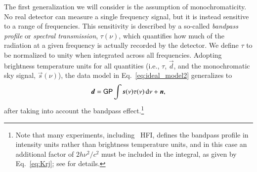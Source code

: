 \documentclass[twocolumn]{aa}
\renewcommand{\d}[0]{\vec{d}}
\newcommand{\n}[0]{\vec{n}}
\newcommand{\s}[0]{\vec{s}}
\renewcommand{\P}[0]{\tens{P}}
\renewcommand{\G}[0]{\tens{G}}
\begin{document}
The first generalization we will consider is the assumption of
monochromaticity. No real detector can measure a single frequency
signal, but it is instead sensitive to a range of frequencies. This
sensitivity is described by a so-called \emph{bandpass profile} or
\emph{spectral transmission}, $\tau(\nu)$, which quantifies how much
of the radiation at a given frequency is actually recorded by the
detector. We define $\tau$ to be normalized to unity when integrated across
all frequencies. Adopting brightness temperature units for all
quantities (i.e., $\tau$, $\d$, and the monochromatic sky signal,
$\s(\nu)$), the data model in Eq.~\eqref{eq:ideal_model2} generalizes to
\begin{equation}
  \d = \G \P\int \s(\nu)\tau(\nu)\,\mathrm d\nu + \n,
  \label{eq:bp}
\end{equation}
after taking into account the bandpass effect.\footnote{Note that many
  experiments, including \Planck\ HFI, defines the bandpass profile in
  intensity units rather than brightness temperature units, and in
  this case an additional factor of $2h\nu^2/c^2$ must be included in
  the integral, as given by Eq.~\eqref{eq:Krj}; see
  \citet{planck2013-p03d} for details.}
\end{document}

